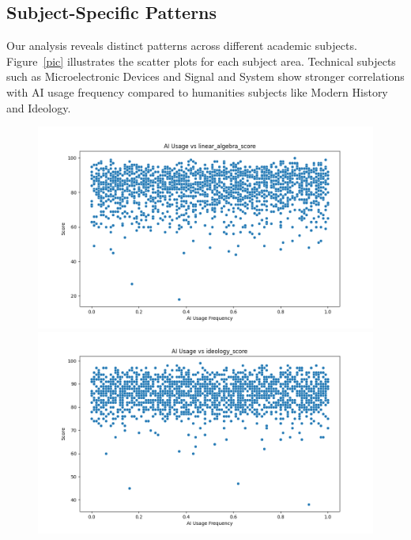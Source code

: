 \documentclass[manuscript,screen,review]{acmart}
\begin{document}
\subsection{Subject-Specific Patterns}

Our analysis reveals distinct patterns across different academic subjects. Figure~\ref{pic} illustrates the scatter plots for each subject area. Technical subjects such as Microelectronic Devices and Signal and System show stronger correlations with AI usage frequency compared to humanities subjects like Modern History and Ideology.

\begin{figure}[H]
    \centering
    \begin{minipage}{0.3\textwidth}
        \centering
        \includegraphics[width=\linewidth]{../results/linear_algebra_score_ai_correlation.png}
    \end{minipage}\hfill
    \begin{minipage}{0.3\textwidth}
        \centering
        \includegraphics[width=\linewidth]{../results/ideology_score_ai_correlation.png} %

\end{minipage}
\end{figure}
\end{document}
